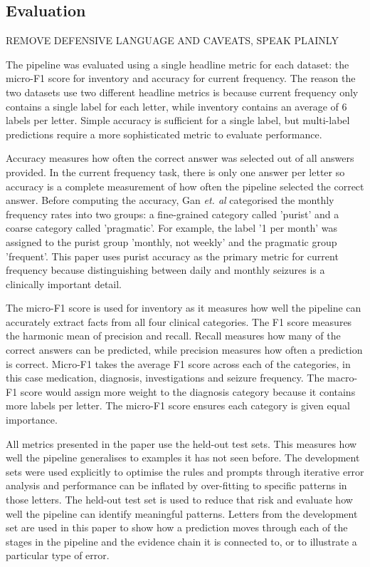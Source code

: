\documentclass[conference]{IEEEtran}
\begin{document}
\subsection{Evaluation}

REMOVE DEFENSIVE LANGUAGE AND CAVEATS, SPEAK PLAINLY

The pipeline was evaluated using a single 
headline metric for each dataset: the micro-F1 
score for inventory and accuracy for current frequency. 
The reason the two datasets use two different 
headline metrics is because current frequency only 
contains a single label for each letter, while inventory 
contains an average of 6 labels per letter. Simple
accuracy is sufficient for a single label, but
multi-label predictions require a more sophisticated
metric to evaluate performance.

Accuracy measures how often the correct answer
was selected out of all answers provided. In 
the current frequency task, there is only one
answer per letter so accuracy is a complete 
measurement of how often the pipeline selected
the correct answer. Before computing the 
accuracy, Gan \emph{et. al} categorised the 
monthly frequency rates into two groups: a 
fine-grained category called 'purist' and a coarse
category called 'pragmatic'. For example, the 
label '1 per month' was assigned to the purist 
group 'monthly, not weekly' and the pragmatic
group 'frequent'. This paper uses purist accuracy 
as the primary metric for current frequency 
because distinguishing between daily and 
monthly seizures is a clinically important detail.

The micro-F1 score is used for inventory as it 
measures how well the pipeline can accurately 
extract facts from all four clinical categories.  
The F1 score measures the harmonic mean of
precision and recall. Recall measures how many
of the correct answers can be predicted, while
precision measures how often a prediction is
correct. Micro-F1 takes the average F1 score 
across each of the categories, in this case 
medication, diagnosis, investigations and 
seizure frequency. The macro-F1 score would 
assign more weight to the diagnosis category
because it contains more labels per letter. The 
micro-F1 score ensures each category is given 
equal importance.

All metrics presented in the paper use the held-out
test sets. This measures how well the pipeline
generalises to examples it has not seen before. The 
development sets were used explicitly to optimise the 
rules and prompts through iterative error analysis 
and performance can be inflated by over-fitting to 
specific patterns in those letters. The held-out test
set is used to reduce that risk and evaluate how 
well the pipeline can identify meaningful patterns.
Letters from the development set are used in this 
paper to show how a prediction moves through each 
of the stages in the pipeline and the evidence chain 
it is connected to, or to illustrate a particular type of 
error.
\end{document}
